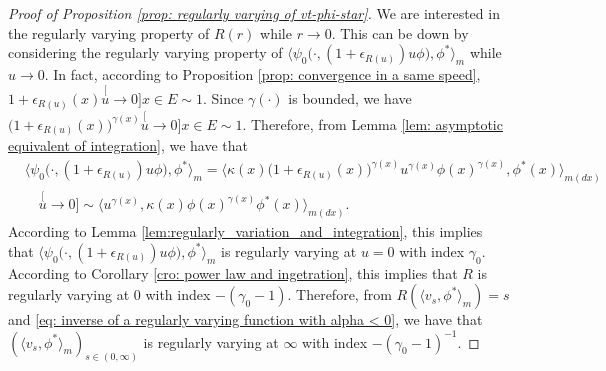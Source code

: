 \documentclass[12pt, a4paper]{amsart}
\theoremstyle{definition}
\numberwithin{equation}{section}
\begin{document}
\begin{proof}[Proof of Proposition \ref{prop: regularly varying of vt-phi-star}]
	We are interested in the regularly varying property of $R(r)$ while $r\to 0$.
	This can be down by considering the regularly varying property of $\big\langle \psi_0 \big(\cdot ,( 1 + \epsilon_{R(u)} ) u \phi \big), \phi^* \big\rangle_m$ while $u \to 0$.
In fact, according to Proposition \ref{prop: convergence in a same speed},  $1+ \epsilon_{R(u)}(x) \stackrel[u\to 0]{x\in E}{\sim} 1$. Since
$\gamma(\cdot)$ is bounded, we have $\big(1+ \epsilon_{R(u)}(x)\big)^{\gamma(x)}\stackrel[u\to 0]{x\in E}{\sim} 1$.
	Therefore, from Lemma \ref{lem: asymptotic equivalent of integration}, we have that
\[\label{eq: }\begin{split}
	&\big\langle \psi_0 \big(\cdot,( 1 + \epsilon_{R(u)} ) u \phi \big), \phi^* \big\rangle_m
	= \big\langle \kappa (x)\big( 1 + \epsilon_{R(u)}(x)\big )^{\gamma(x)} u^{\gamma(x)} \phi(x)^{\gamma(x)} , \phi^*(x) \big\rangle_{m(dx)}
	\\ &\quad \stackrel[u\to 0]{}{\sim}  \langle u^{\gamma(x)} , \kappa (x)\phi(x)^{\gamma(x)} \phi^*(x) \rangle_{m(dx)}.
\end{split}\]
	According to Lemma \ref{lem:regularly_variation_and_integration}, this implies that $\langle \psi_0\big(\cdot,(1+\epsilon_{R(u)})u\phi \big), \phi^* \rangle_m$ is regularly varying at $u = 0$ with index $\gamma_0$.
	According to Corollary \ref{cro: power law and ingetration}, this implies that $R$ is regularly varying at $0$ with index $-(\gamma_0 - 1)$.
	Therefore, from $R(\langle v_s, \phi^*\rangle_m) = s$ and \eqref{eq: inverse of a regularly varying function with alpha < 0}, we have that $(\langle v_s, \phi^*\rangle_m)_{s\in (0,\infty)}$ is regularly varying at $\infty$ with index $-(\gamma_0 - 1)^{-1}$.
	

\end{proof}
\end{document}
